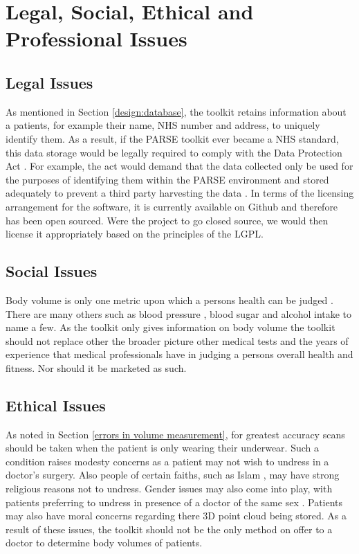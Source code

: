 \chapter{Legal, Social, Ethical and Professional Issues}
\label{legal, social, ethical and professional issues}

\section{Legal Issues}

As mentioned in Section \ref{design:database}, the toolkit retains information about a patients, for example their name, NHS number and address, to uniquely identify them. As a result, if the PARSE toolkit ever became a NHS standard, this data storage would be legally required to comply with the Data Protection Act \cite{hmso1998}. For example, the act would demand that the data collected only be used for the purposes of identifying them within the PARSE environment and stored adequately to prevent a third party harvesting the data \cite{hmso1998}. In terms of the licensing arrangement for the software, it is currently available on Github and therefore has been open sourced. Were the project to go closed source, we would then license it appropriately based on the principles of the LGPL.

\section{Social Issues}
\label{social}
Body volume is only one metric upon which a persons health can be judged \cite{charnock1999}. There are many others such as blood pressure \cite{group1998}, blood sugar \cite{hopkins1915} and alcohol intake \cite{klatsky1977} to name a few. As the toolkit only gives information on body volume the toolkit should not replace other the broader picture other medical tests and the years of experience that medical professionals have in judging a persons overall health and fitness.  Nor should it be marketed as such.\\

\section{Ethical Issues}
As noted in Section \ref{errors in volume measurement}, for greatest accuracy scans should be taken when the patient is only wearing their underwear. Such a condition raises modesty concerns as a patient may not wish to undress in a doctor's surgery. Also people of certain faiths, such as Islam \cite{maqsood2006}, may have strong religious reasons not to undress. Gender issues may also come into play, with patients preferring to undress in presence of a doctor of the same sex \cite{zelek2003}. Patients may also have moral concerns regarding there 3D point cloud being stored. As a result of these issues, the toolkit should not be the only method on offer to a doctor to determine body volumes of patients.\\

